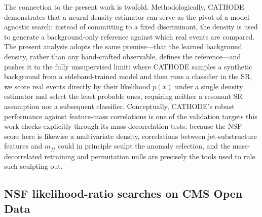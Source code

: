 \documentclass[11pt,a4paper,twocolumn]{article}
\begin{document}
The connection to the present work is twofold. Methodologically, CATHODE demonstrates that a neural density estimator can serve as the pivot of a model-agnostic search: instead of committing to a fixed discriminant, the density is used to generate a background-only reference against which real events are compared. The present analysis adopts the same premise---that the learned background density, rather than any hand-crafted observable, defines the reference---and pushes it to the fully unsupervised limit: where CATHODE samples a synthetic background from a sideband-trained model and then runs a classifier in the SR, we score real events directly by their likelihood $p(x)$ under a single density estimator and select the least probable ones, requiring neither a resonant SR assumption nor a subsequent classifier. Conceptually, CATHODE's robust performance against feature-mass correlations is one of the validation targets this work checks explicitly through its mass-decorrelation tests: because the NSF score here is likewise a multivariate density, correlations between jet-substructure features and $m_{jj}$ could in principle sculpt the anomaly selection, and the mass-decorrelated retraining and permutation nulls are precisely the tools used to rule such sculpting out.

\subsection{NSF likelihood-ratio searches on CMS Open Data}
\label{sec:lit-nsf-monoz}
\end{document}

